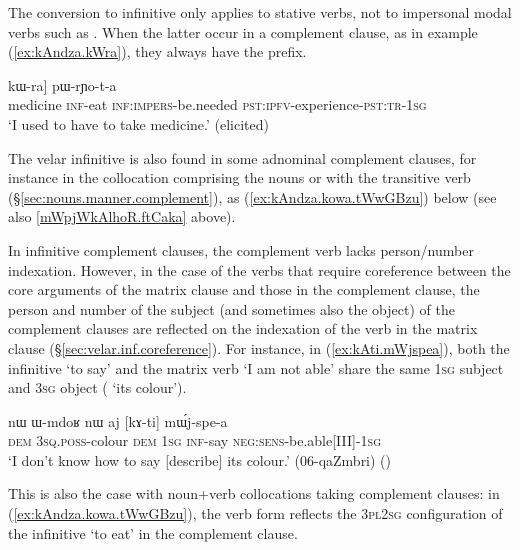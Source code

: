 The conversion to  infinitive only applies to stative verbs, not to impersonal modal verbs such as . When the latter occur in a complement clause, as in example (\ref{ex:kAndza.kWra}), they always have the  prefix.

\begin{exe}
\ex \label{ex:kAndza.kWra}
\gll  [[smɤn kɤ-ndza] kɯ-ra] pɯ-rɲo-t-a  \\ 
medicine \textsc{inf}-eat \textsc{inf}:\textsc{impers}-be.needed  \textsc{pst}:\textsc{ipfv}-experience-\textsc{pst}:\textsc{tr}-\textsc{1sg} \\
\glt `I used to have to take medicine.' (elicited)
\end{exe} 
 
The velar infinitive is also found in some adnominal complement clauses, for instance in the collocation comprising the nouns  or  with the transitive verb  (§\ref{sec:nouns.manner.complement}), as (\ref{ex:kAndza.kowa.tWwGBzu}) below (see also  \ref{mWpjWkAlhoR.ftCaka} above). 

In infinitive complement clauses, the complement verb lacks person/number indexation. However, in the case of the verbs that require coreference between the core arguments of the matrix clause and those in the complement clause, the person and number of the subject (and sometimes also the object) of the complement clauses are reflected on the indexation of the verb in the matrix clause (§\ref{sec:velar.inf.coreference}). For instance, in (\ref{ex:kAti.mWjspea}), both the infinitive  `to say' and the matrix verb  `I am not able' share the same \textsc{1sg} subject and \textsc{3sg} object ( `its colour').  

\begin{exe}
\ex \label{ex:kAti.mWjspea}
\gll nɯ ɯ-mdoʁ nɯ aj [kɤ-ti] mɯ́j-spe-a \\
\textsc{dem} \textsc{3sq}.\textsc{poss}-colour \textsc{dem} \textsc{1sg} \textsc{inf}-say \textsc{neg}:\textsc{sens}-be.able[III]-\textsc{1sg} \\
\glt `I don't know how to say [describe] its colour.' (06-qaZmbri)
()
  \end{exe} 
  
 This is also the case with noun+verb collocations taking complement clauses: in (\ref{ex:kAndza.kowa.tWwGBzu}), the verb form  reflects the \textsc{3pl}\fl{}\textsc{2sg} configuration of the infinitive  `to eat' in the complement clause. 
  
